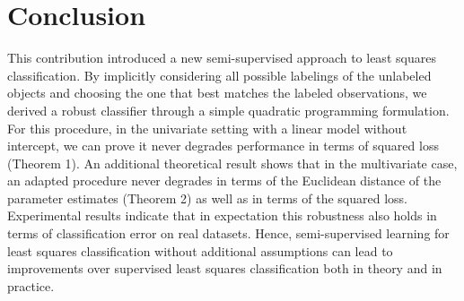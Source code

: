 \documentclass{llncs}
\begin{document}



\section{Conclusion}
This contribution introduced a new semi-supervised approach to least squares classification. By implicitly considering all possible labelings of the unlabeled objects and choosing the one that best matches the labeled observations, we derived a robust classifier through a simple quadratic programming formulation. For this procedure, in the univariate setting with a linear model without intercept, we can prove it never degrades performance in terms of squared loss (Theorem 1). An additional theoretical result shows that in the multivariate case, an adapted procedure never degrades in terms of the Euclidean distance of the parameter estimates (Theorem 2) as well as in terms of the squared loss. Experimental results indicate that in expectation this robustness also holds in terms of classification error on real datasets. Hence, semi-supervised learning for least squares classification without additional assumptions can lead to improvements over supervised least squares classification both in theory and in practice.




\end{document}
